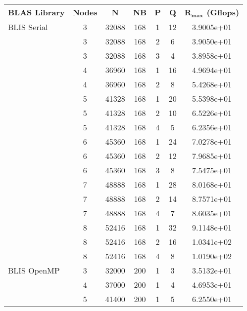 \begin{table}
\begin{center}
\begin{tabular}{ |l|c|c|c|c|c|c| } 
\hline
\textbf{BLAS Library} & \textbf{Nodes} & \textbf{N} & \textbf{NB} & \textbf{P} & \textbf{Q} & \textbf{$\mathbf{R_{max}}$ (Gflops)} \\ 
\hline
BLIS Serial     & 3 & 32088 & 168 & 1 & 12 & 3.9005e+01 \\ 
                & 3 & 32088 & 168 & 2 &  6 & 3.9050e+01 \\ 
                & 3 & 32088 & 168 & 3 &  4 & 3.8958e+01 \\ 
                \cline{2-7} 
                & 4 & 36960 & 168 & 1 & 16 & 4.9694e+01 \\ 
                & 4 & 36960 & 168 & 2 &  8 & 5.4268e+01\\ 
                \cline{2-7} 
                & 5 & 41328 & 168 & 1 & 20 & 5.5398e+01 \\ 
                & 5 & 41328 & 168 & 2 & 10 & 6.5226e+01 \\ 
                & 5 & 41328 & 168 & 4 &  5 & 6.2356e+01 \\ 
                \cline{2-7} 
                & 6 & 45360 & 168 & 1 & 24 & 7.0278e+01 \\ 
                & 6 & 45360 & 168 & 2 & 12 & 7.9685e+01 \\ 
                & 6 & 45360 & 168 & 3 &  8 & 7.5475e+01 \\ 
                \cline{2-7} 
                & 7 & 48888 & 168 & 1 & 28 & 8.0168e+01 \\ 
                & 7 & 48888 & 168 & 2 & 14 & 8.7571e+01 \\ 
                & 7 & 48888 & 168 & 4 &  7 & 8.6035e+01 \\ 
                \cline{2-7} 
                & 8 & 52416 & 168 & 1 & 32 & 9.1148e+01 \\ 
                & 8 & 52416 & 168 & 2 & 16 & 1.0341e+02 \\ 
                & 8 & 52416 & 168 & 4 &  8 & 1.0190e+02 \\ 
\hline
BLIS OpenMP     & 3 & 32000 & 200 & 1 & 3 & 3.5132e+01 \\ 
                \cline{2-7} 
                & 4 & 37000 & 200 & 1 & 4 & 4.6953e+01 \\ 
                \cline{2-7} 
                & 5 & 41400 & 200 & 1 & 5 & 6.2550e+01 \\ 
                \cline{2-7} 

\end{tabular}
\end{center}
\end{table}
